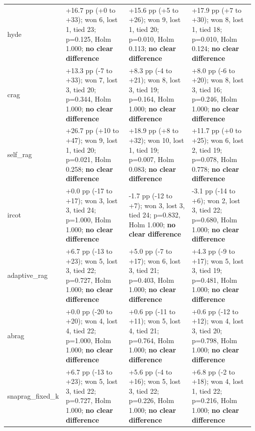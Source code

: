 \begin{table}[t]
{\begin{tabular}{llll}
hyde & +16.7 pp (+0 to +33); won 6, lost 1, tied 23; p=0.125, Holm 1.000; \textbf{no clear difference} & +15.6 pp (+5 to +26); won 9, lost 1, tied 20; p=0.010, Holm 0.113; \textbf{no clear difference} & +17.9 pp (+7 to +30); won 8, lost 1, tied 18; p=0.010, Holm 0.124; \textbf{no clear difference} \\
crag & +13.3 pp (-7 to +33); won 7, lost 3, tied 20; p=0.344, Holm 1.000; \textbf{no clear difference} & +8.3 pp (-4 to +21); won 8, lost 3, tied 19; p=0.164, Holm 1.000; \textbf{no clear difference} & +8.0 pp (-6 to +20); won 8, lost 3, tied 16; p=0.246, Holm 1.000; \textbf{no clear difference} \\
self\_rag & +26.7 pp (+10 to +47); won 9, lost 1, tied 20; p=0.021, Holm 0.258; \textbf{no clear difference} & +18.9 pp (+8 to +32); won 10, lost 1, tied 19; p=0.007, Holm 0.083; \textbf{no clear difference} & +11.7 pp (+0 to +25); won 6, lost 2, tied 19; p=0.078, Holm 0.778; \textbf{no clear difference} \\
ircot & +0.0 pp (-17 to +17); won 3, lost 3, tied 24; p=1.000, Holm 1.000; \textbf{no clear difference} & -1.7 pp (-12 to +7); won 3, lost 3, tied 24; p=0.832, Holm 1.000; \textbf{no clear difference} & -3.1 pp (-14 to +6); won 2, lost 3, tied 22; p=0.680, Holm 1.000; \textbf{no clear difference} \\
adaptive\_rag & +6.7 pp (-13 to +23); won 5, lost 3, tied 22; p=0.727, Holm 1.000; \textbf{no clear difference} & +5.0 pp (-7 to +17); won 6, lost 3, tied 21; p=0.403, Holm 1.000; \textbf{no clear difference} & +4.3 pp (-9 to +17); won 5, lost 3, tied 19; p=0.481, Holm 1.000; \textbf{no clear difference} \\
abrag & +0.0 pp (-20 to +20); won 4, lost 4, tied 22; p=1.000, Holm 1.000; \textbf{no clear difference} & +0.6 pp (-11 to +11); won 5, lost 4, tied 21; p=0.764, Holm 1.000; \textbf{no clear difference} & +0.6 pp (-12 to +12); won 4, lost 3, tied 20; p=0.798, Holm 1.000; \textbf{no clear difference} \\
snaprag\_fixed\_k & +6.7 pp (-13 to +23); won 5, lost 3, tied 22; p=0.727, Holm 1.000; \textbf{no clear difference} & +5.6 pp (-4 to +16); won 5, lost 3, tied 22; p=0.226, Holm 1.000; \textbf{no clear difference} & +6.8 pp (-2 to +18); won 4, lost 1, tied 22; p=0.216, Holm 1.000; \textbf{no clear difference} \\
\bottomrule
\end{tabular}}
\end{table}


